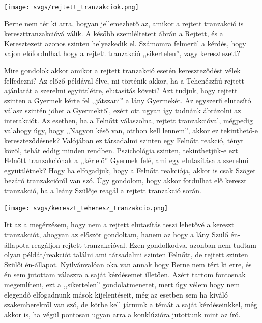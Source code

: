 \documentclass[a4paper,12pt]{article}
\begin{document}
	
	
	\begin{center}
		\texttt{[image: svgs/rejtett\_tranzakciok.png]} \\[0.5cm]
	\end{center}

	Berne nem tér ki arra, hogyan jellemezhető az, amikor a rejtett tranzakció is kereszttranzakcióvá válik. A később szemléltetett ábrán a Rejtett, és a Keresztezett azonos szinten helyezkedik el. Számomra felmerül a kérdés, hogy vajon előfordulhat hogy a rejtett tranzakció ,,sikertelen'', vagy keresztezett?
	
	Mire gondolok akkor amikor a rejtett tranzakció esetén kereszteződést vélek felfedezni?
	Az előző példával élve, mi történik akkor, ha a Tehenészfiú rejtett ajánlatát a szerelmi együttlétre, elutasítás követi? Azt tudjuk, hogy rejtett szinten a Gyermek kérte fel ,,játszani'' a lány Gyermekét. Az egyszerű elutasító válasz szintén jöhet a Gyermektől, ezért ott ugyan így tudnánk ábrázolni az interakciót. Az esetben, ha a Felnőtt válaszolna, rejtett tranzakcióval, mégpedig valahogy úgy, hogy ,,Nagyon késő van, otthon kell lennem'', akkor ez tekinthető-e kereszteződésnek? Valójában ez társadalmi szinten  egy Felnőtt reakció, tényt közöl, tehát eddig minden rendben. Pszichológia szinten, tekinthetjük-e ezt Felnőtt tranzakciónak a ,,kérlelő'' Gyermek felé, ami egy elutasítása a szerelmi együttlétnek? Hogy ha elfogadjuk, hogy a Felnőtt reakciója, akkor is csak Szöget bezáró tranzakcióról van szó.
	Úgy gondolom, hogy akkor fordulhat elő kereszt tranzakció, ha a leány Szülője reagál a rejtett tranzakció során.
	
		\begin{center}
		\texttt{[image: svgs/kereszt\_tehenesz\_tranzakcio.png]} \\[0.5cm]
	\end{center}
	Itt az a megérzésem, hogy nem a rejtett elutasítás teszi lehetővé a kereszt tranzakciót, ahogyan az először gondoltam, hanem az hogy a lány Szülő én-állapota reagáljon rejtett tranzakcióval. Ezen gondolkodva, azonban nem tudtam olyan példát/reakciót találni ami társadalmi szinten Felnőtt, de rejtett szinten Szülői én-állapot. Nyilvánvalóan oka van annak hogy Berne nem tért ki erre, és én sem jutottam válaszra a saját kérdésemet illetően. Azért tartom fontosnak megemlíteni, ezt a ,,sikertelen'' gondolatmenetet, mert úgy vélem hogy nem elegendő elfogadnunk mások kijelentéseit, még az esetben sem ha kiváló szakemberekről van szó, de körbe kell járnunk a témát a saját kérdéseinkkel, még akkor is, ha végül pontosan ugyan arra a konklúzióra jutottunk mint az író. 
\end{document}
